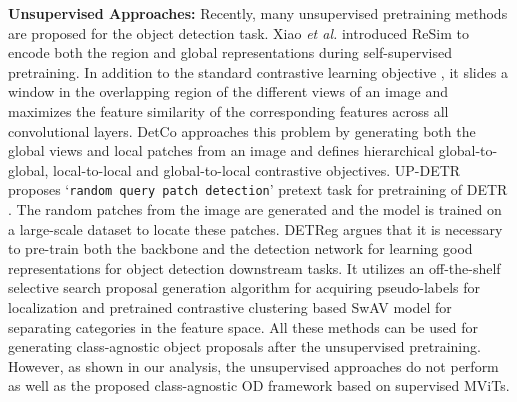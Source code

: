 \documentclass[runningheads]{llncs}
\def\etal{\emph{et al.}\xspace}
\newcommand{\txt}[1]{{\texttt{#1}}}
\begin{document}
\noindent \textbf{Unsupervised Approaches:} Recently, many unsupervised pretraining methods are proposed for the object detection task. Xiao \etal introduced ReSim \cite{xiao2021region} to encode both the region and global representations during self-supervised pretraining. In addition to the standard contrastive learning objective \cite{MoCo,pmlr-v119-chen20j}, it slides a window in the overlapping region of the different views of an image and maximizes the feature similarity of the corresponding features across all convolutional layers. DetCo \cite{xie2021detco} approaches this problem by generating both the global views and local patches from an image and defines hierarchical global-to-global, local-to-local and global-to-local contrastive objectives. UP-DETR \cite{dai2021up} proposes ‘\txt{random query patch detection}' pretext task for pretraining of DETR \cite{DETR}. The random patches from the image are generated and the model is trained on a large-scale dataset to locate these patches. DETReg \cite{detreg} argues that it is necessary to pre-train both the backbone and the detection network for learning good representations for object detection downstream tasks. It utilizes an off-the-shelf selective search \cite{uijlings2013selective} proposal generation algorithm for acquiring pseudo-labels for localization and pretrained contrastive clustering based SwAV \cite{SwAV} model for separating categories in the feature space. All these methods can be used for generating class-agnostic object proposals after the unsupervised pretraining. However, as shown in our analysis, the unsupervised approaches do not perform as well as the proposed class-agnostic OD framework based on supervised MViTs.
\end{document}

